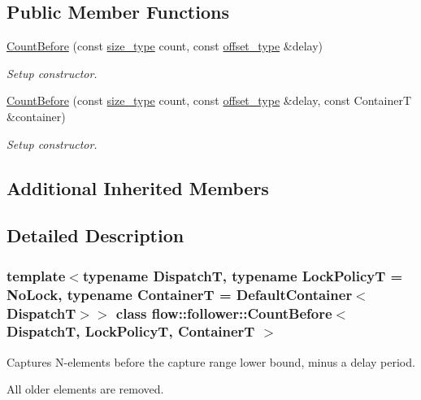 \subsection*{Public Member Functions}
\begin{DoxyCompactItemize}
\item 
\hyperlink{classflow_1_1follower_1_1_count_before_a9bb3a82fbb60dcf7588173d84c4383e9}{Count\+Before} (const \hyperlink{classflow_1_1follower_1_1_count_before_a80c833853e8f7f856338a984aeacb993}{size\+\_\+type} count, const \hyperlink{classflow_1_1follower_1_1_count_before_a235f01dc3187d79c55aaf13d1f819c15}{offset\+\_\+type} \&delay)
\begin{DoxyCompactList}\small\item\em Setup constructor. \end{DoxyCompactList}\item 
\hyperlink{classflow_1_1follower_1_1_count_before_a25c06cedc4223a81af8637a17cb201f2}{Count\+Before} (const \hyperlink{classflow_1_1follower_1_1_count_before_a80c833853e8f7f856338a984aeacb993}{size\+\_\+type} count, const \hyperlink{classflow_1_1follower_1_1_count_before_a235f01dc3187d79c55aaf13d1f819c15}{offset\+\_\+type} \&delay, const ContainerT \&container)
\begin{DoxyCompactList}\small\item\em Setup constructor. \end{DoxyCompactList}\end{DoxyCompactItemize}
\subsection*{Additional Inherited Members}


\subsection{Detailed Description}
\subsubsection*{template$<$typename DispatchT, typename Lock\+PolicyT = No\+Lock, typename ContainerT = Default\+Container$<$\+Dispatch\+T$>$$>$\newline
class flow\+::follower\+::\+Count\+Before$<$ Dispatch\+T, Lock\+Policy\+T, Container\+T $>$}

Captures N-\/elements before the capture range lower bound, minus a delay period. 

All older elements are removed.


